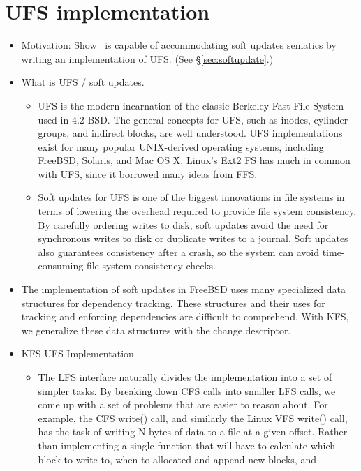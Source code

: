 \section{UFS implementation}
\label{sec:ufs}

\begin{itemize}
\item Motivation: Show \Kudos\ is capable of accommodating soft updates
  sematics by writing an implementation of UFS. (See \S\ref{sec:softupdate}.)
\item What is UFS / soft updates.
  \begin{itemize}
  \item UFS is the modern incarnation of the classic Berkeley Fast File
    System ~\cite{mckusick84fast} used in 4.2 BSD. The general concepts for
    UFS, such as inodes, cylinder groups, and indirect blocks, are well
    understood. UFS implementations exist for many popular UNIX-derived
    operating systems, including FreeBSD, Solaris, and Mac OS X. Linux's
    Ext2 FS has much in common with UFS, since it borrowed many ideas from FFS.
  \item Soft updates for UFS is one of the biggest innovations in file
    systems in terms of lowering the overhead required to provide file
    system consistency. By carefully ordering writes to disk, soft updates
    avoid the need for synchronous writes to disk or duplicate writes to a
    journal. Soft updates also guarantees consistency after a crash, so
    the system can avoid time-consuming file system consistency checks.
  \end{itemize}
\item The implementation of soft updates in FreeBSD uses many specialized
    data structures for dependency tracking. These structures and their
    uses for tracking and enforcing dependencies are difficult to comprehend.
    With KFS, we generalize these data structures with the change descriptor.
\item KFS UFS Implementation
  \begin{itemize}
  \item The LFS interface naturally divides the implementation into a set
    of simpler tasks. By breaking down CFS calls into smaller LFS calls, we
    come up with a set of problems that are easier to reason about. For
    example, the CFS write() call, and similarly the Linux VFS write() call,
    has the task of writing N bytes of data to a file at a given offset.
    Rather than implementing a single function that will have to calculate
    which block to write to, when to allocated and append new blocks, and

\end{itemize}
\end{itemize}
